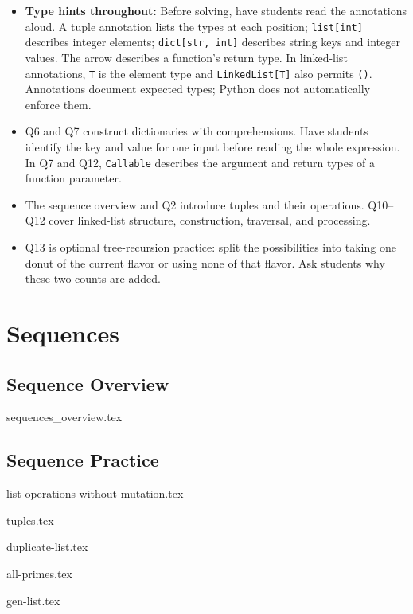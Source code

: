 \documentclass{exam}
\begin{document}
\begin{meta}
\begin{itemize}
    \item \textbf{Type hints throughout:} Before solving, have students read the annotations aloud. A tuple annotation lists the types at each position; \lstinline{list[int]} describes integer elements; \lstinline{dict[str, int]} describes string keys and integer values. The arrow describes a function's return type. In linked-list annotations, \lstinline{T} is the element type and \lstinline{LinkedList[T]} also permits \lstinline{()}. Annotations document expected types; Python does not automatically enforce them.
    \item Q6 and Q7 construct dictionaries with comprehensions. Have students identify the key and value for one input before reading the whole expression. In Q7 and Q12, \lstinline{Callable} describes the argument and return types of a function parameter.
    \item The sequence overview and Q2 introduce tuples and their operations. Q10--Q12 cover linked-list structure, construction, traversal, and processing.
    \item Q13 is optional tree-recursion practice: split the possibilities into taking one donut of the current flavor or using none of that flavor. Ask students why these two counts are added.
\end{itemize}
\end{meta}

\section{Sequences}
\subsection*{Sequence Overview}
\begingroup
{sequences_overview.tex}
\endgroup
\par
\ifdefined\discussionmetas\else\newpage\fi
\subsection*{Sequence Practice}
\begin{questions}
    {list-operations-without-mutation.tex}

    {tuples.tex}

    {duplicate-list.tex}

    {all-primes.tex}

    {gen-list.tex}
\end{questions}
\end{document}
